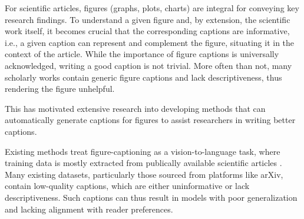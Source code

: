\documentclass[11pt]{article}
\renewcommand{\cite}[1]{\citep{#1}}
\begin{document}
For scientific articles, figures (graphs, plots, charts) are integral for conveying key research findings. To understand a given figure and, by extension, the scientific work itself, it becomes crucial that the corresponding captions are informative, i.e., a given caption can represent and complement the figure, situating it in the context of the article. While the importance of figure captions is universally acknowledged, writing a good caption is not trivial. More often than not, many scholarly works contain generic figure captions and lack descriptiveness, thus rendering the figure unhelpful. 

This has motivated extensive research into developing methods that can automatically generate captions for figures to assist researchers in writing better captions.



Existing methods treat figure-captioning as a vision-to-language task, where training data is mostly extracted from publically available scientific articles \cite{hsu-etal-2021-scicap-generating}. Many existing datasets, particularly those sourced from platforms like arXiv, contain low-quality captions, which are either uninformative or lack descriptiveness. Such captions can thus result in models with poor generalization and lacking alignment with reader preferences.

\end{document}
